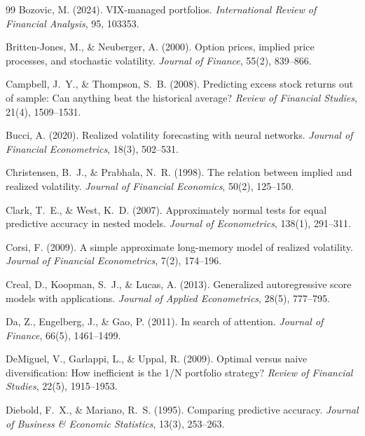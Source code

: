 \documentclass[12pt,a4paper]{article}
\begin{document}
\begin{thebibliography}{99}
Bozovic, M. (2024). VIX-managed portfolios. \textit{International Review of Financial Analysis}, 95, 103353.

Britten-Jones, M., \& Neuberger, A. (2000). Option prices, implied price processes, and stochastic volatility. \textit{Journal of Finance}, 55(2), 839--866.

Campbell, J.~Y., \& Thompson, S.~B. (2008). Predicting excess stock returns out of sample: Can anything beat the historical average? \textit{Review of Financial Studies}, 21(4), 1509--1531.

Bucci, A. (2020). Realized volatility forecasting with neural networks. \textit{Journal of Financial Econometrics}, 18(3), 502--531.

Christensen, B.~J., \& Prabhala, N.~R. (1998). The relation between implied and realized volatility. \textit{Journal of Financial Economics}, 50(2), 125--150.

Clark, T.~E., \& West, K.~D. (2007). Approximately normal tests for equal predictive accuracy in nested models. \textit{Journal of Econometrics}, 138(1), 291--311.

Corsi, F. (2009). A simple approximate long-memory model of realized volatility. \textit{Journal of Financial Econometrics}, 7(2), 174--196.

Creal, D., Koopman, S.~J., \& Lucas, A. (2013). Generalized autoregressive score models with applications. \textit{Journal of Applied Econometrics}, 28(5), 777--795.

Da, Z., Engelberg, J., \& Gao, P. (2011). In search of attention. \textit{Journal of Finance}, 66(5), 1461--1499.

DeMiguel, V., Garlappi, L., \& Uppal, R. (2009). Optimal versus naive diversification: How inefficient is the 1/N portfolio strategy? \textit{Review of Financial Studies}, 22(5), 1915--1953.

Diebold, F.~X., \& Mariano, R.~S. (1995). Comparing predictive accuracy. \textit{Journal of Business \& Economic Statistics}, 13(3), 253--263.


\end{thebibliography}
\end{document}
